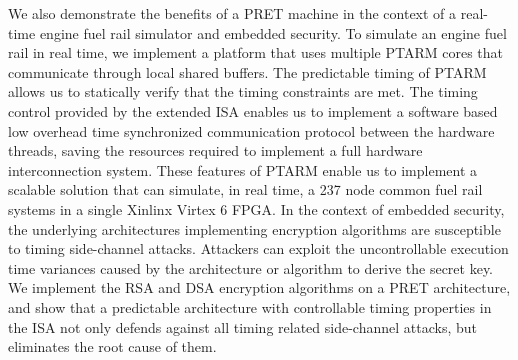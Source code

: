 We also demonstrate the benefits of a PRET machine in the context of a real-time engine fuel rail simulator and embedded security.
To simulate an engine fuel rail in real time, we implement a platform that uses multiple PTARM cores that communicate through local shared buffers. 
The predictable timing of PTARM allows us to statically verify that the timing constraints are met.  
The timing control provided by the extended ISA enables us to implement a software based low overhead time synchronized communication protocol between the hardware threads, saving the resources required to implement a full hardware interconnection system.
These features of PTARM enable us to implement a scalable solution that can simulate, in real time, a 237 node common fuel rail systems in a single Xinlinx Virtex 6 FPGA. 
In the context of embedded security, the underlying architectures implementing encryption algorithms are susceptible to timing side-channel attacks.
Attackers can exploit the uncontrollable execution time variances caused by the architecture or algorithm to derive the secret key. 
We implement the RSA and DSA encryption algorithms on a PRET architecture, and show that a predictable architecture with controllable timing properties in the ISA not only defends against all timing related side-channel attacks, but eliminates the root cause of them. 


